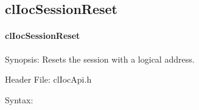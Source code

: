 \begin{flushleft}
\subsection{clIocSessionReset}
\hypertarget{pageIOC107}{}\paragraph{cl\-Ioc\-Session\-Reset}\label{pageIOC107}
\begin{Desc}
\item[Synopsis:]Resets the session with a logical address.\end{Desc}
\begin{Desc}
\item[Header File:]clIocApi.h\end{Desc}
\begin{Desc}
\item[Syntax:]


\end{Desc}
\end{flushleft}
